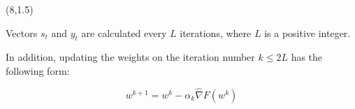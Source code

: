 \documentclass[a0]{a0poster}
\def\Head#1{\noindent{\LARGE\color{bluegray} #1}\bigskip}
\begin{document}
\begin{textblock}{7.0}(8,1.5)

Vectors $s_t$ and $y_t$ are calculated every $L$ iterations, where $L$ is a positive integer.

In addition, updating the weights on the iteration number $k \leq 2L$ has the following form:

$$w^{k+1} = w^k - \alpha_k\widehat{\nabla}F(w^k)$$
%		
%



\end{textblock}
\end{document}
